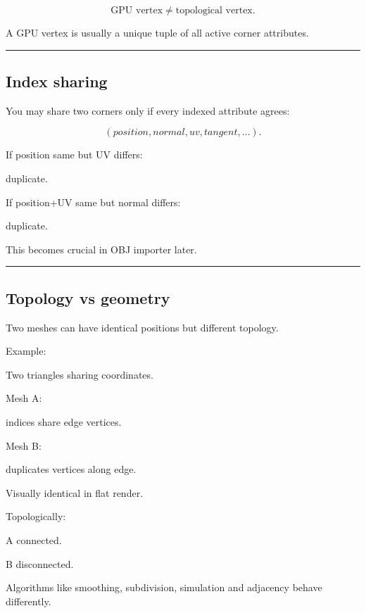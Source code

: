 \[
\boxed{
\text{GPU vertex}
\neq
\text{topological vertex}.
}
\]

A GPU vertex is usually a unique tuple of all active corner attributes.

\begin{center}\rule{0.5\linewidth}{0.5pt}\end{center}

\subsection{Index sharing}\label{04-visual-computing-ii-ch041-index-sharing}

\hypertarget{04-visual-computing-ii-ch041-index-sharing}{}

You may share two corners only if every indexed attribute agrees:

\[
(position,normal,uv,tangent,\ldots).
\]

If position same but UV differs:

duplicate.

If position+UV same but normal differs:

duplicate.

This becomes crucial in OBJ importer later.

\begin{center}\rule{0.5\linewidth}{0.5pt}\end{center}

\subsection{Topology vs geometry}\label{04-visual-computing-ii-ch041-topology-vs-geometry}

\hypertarget{04-visual-computing-ii-ch041-topology-vs-geometry}{}

Two meshes can have identical positions but different topology.

Example:

Two triangles sharing coordinates.

Mesh A:

indices share edge vertices.

Mesh B:

duplicates vertices along edge.

Visually identical in flat render.

Topologically:

A connected.

B disconnected.

Algorithms like smoothing, subdivision, simulation and adjacency behave differently.

